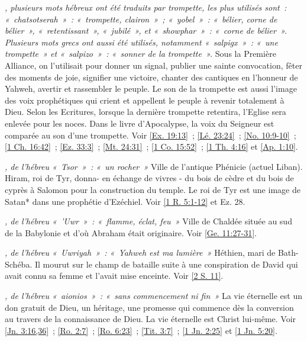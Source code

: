 \begin{multicols}{2}
\textit{, plusieurs mots hébreux ont été traduits par trompette, les plus utilisés sont~: «~chatsotserah~»~: «~trompette, clairon~»~; «~yobel~»~: «~bélier, corne de bélier~», «~retentissant~», «~jubilé~», et «~showphar~»~: «~corne de bélier~». Plusieurs mots grecs ont aussi été utilisés, notamment «~salpigx~»~: «~une trompette~» et «~salpizo~»~: «~sonner de la trompette~».}\newline
Sous la Première Alliance, on l'utilisait pour donner un signal, publier une sainte convocation, fêter des moments de joie, signifier une victoire, chanter des cantiques en l'honneur de Yahweh, avertir et rassembler le peuple. Le son de la trompette est aussi l'image des voix prophétiques qui crient et appellent le peuple à revenir totalement à Dieu. Selon les Ecritures, lorsque la dernière trompette retentira, l'Eglise sera enlevée pour les noces. Dans le livre d'Apocalypse, la voix du Seigneur est comparée au son d'une trompette. Voir \vref{Ex. 19:13}~; \vref{Lé. 23:24}~; \vref{No. 10:9-10}~; \vref{1 Ch. 16:42}~; \vref{Ez. 33:3}~; \vref{Mt. 24:31}~; \vref{1 Co. 15:52}~; \vref{1 Th. 4:16} et \vref{Ap. 1:10}.

\textit{, de l'hébreu «~Tsor~»~: «~un rocher~»}\newline
Ville de l'antique Phénicie (actuel Liban). Hiram, roi de Tyr, donna- en échange de vivres - du bois de cèdre et du bois de cyprès à Salomon pour la construction du temple. Le roi de Tyr est une image de Satan* dans une prophétie d'Ezéchiel. Voir \vref{1 R. 5:1-12} et Ez. 28.

\textit{, de l'hébreu «~'Uwr~»~: «~flamme, éclat, feu~»}\newline
Ville de Chaldée située au sud de la Babylonie et d'où Abraham était originaire. Voir \vref{Ge. 11:27-31}.

\textit{, de l'hébreu «~Uwriyah~»~: «~Yahweh est ma lumière~»}\newline
Héthien, mari de Bath-Schéba. Il mourut sur le champ de bataille suite à une conspiration de David qui avait connu sa femme et l'avait mise enceinte. Voir \vref{2 S. 11}.

\textit{, de l'hébreu «~aionios~»~: «~sans commencement ni fin~»}\newline
La vie éternelle est un don gratuit de Dieu, un héritage, une promesse qui commence dès la conversion au travers de la connaissance de Dieu. La vie éternelle est Christ lui-même. Voir \vref{Jn. 3:16,36}~; \vref{Ro. 2:7}~; \vref{Ro. 6:23}~; \vref{Tit. 3:7}~; \vref{1 Jn. 2:25} et \vref{1 Jn. 5:20}.


\end{multicols}
